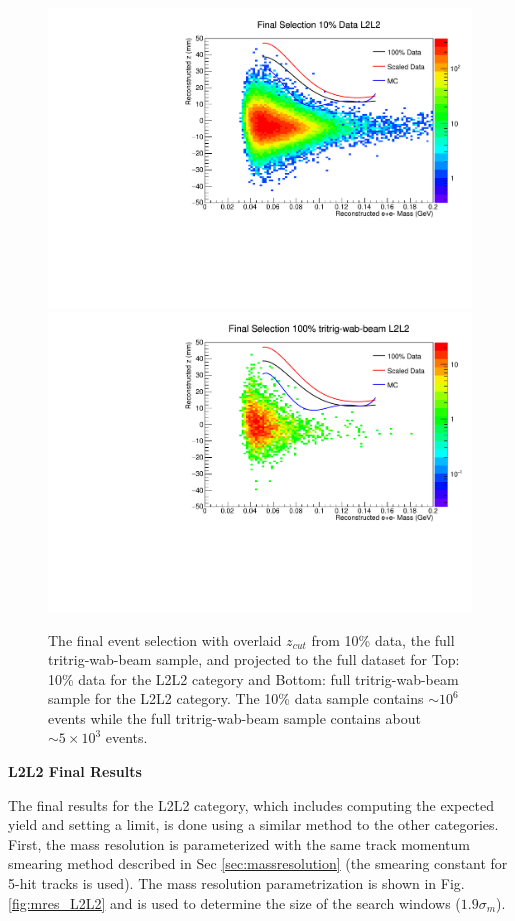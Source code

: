 \begin{figure}[t]
    \centering
    \includegraphics[width=.85\textwidth]{figs/Results/10per_L2L2_final_zcut.pdf}
    \includegraphics[width=.85\textwidth]{figs/Results/tritrig-wab-beam_L2L2_final_zcut.pdf}
    \caption{The final event selection with overlaid $z_{cut}$ from 10\% data, the full tritrig-wab-beam sample, and projected to the full dataset for Top: 10\% data for the L2L2 category and Bottom: full tritrig-wab-beam sample for the L2L2 category. The 10\% data sample contains $\sim10^6$ events while the full tritrig-wab-beam sample contains about $\sim5 \times 10^{3}$ events.}
    \label{fig:final_zcut_L2L2}
\end{figure}

\clearpage

\textbf{L2L2 Final Results}

The final results for the L2L2 category, which includes computing the expected yield and setting a limit, is done using a similar method to the other categories. First, the mass resolution is parameterized with the same track momentum smearing method described in Sec \ref{sec:massresolution} (the smearing constant for 5-hit tracks is used). The mass resolution parametrization is shown in Fig. \ref{fig:mres_L2L2} and is used to determine the size of the search windows ($1.9\sigma_m$).

